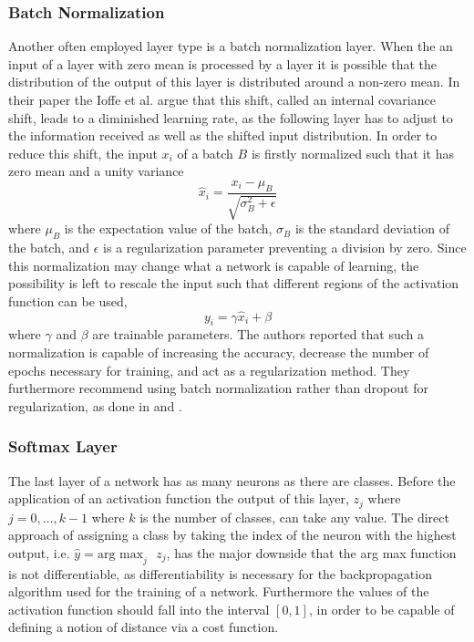 
\subsubsection{Batch Normalization}

Another often employed layer type is a batch normalization layer. When the an input of a layer with zero mean is processed by a layer it is possible that the distribution of the output of this layer is distributed around a non-zero mean. In their paper \cite{Ioffe2015} the Ioffe et al. argue that this shift, called an internal covariance shift, leads to a diminished learning rate, as the following layer has to adjust to the information received as well as the shifted input distribution. In order to reduce this shift, the input $x_i$ of a batch $B$ is firstly normalized such that it has zero mean and a unity variance
\begin{equation}
\hat{x}_i = \frac{x_i-\mu_B}{\sqrt{\sigma_B^2+\epsilon}}
\end{equation}
where $\mu_B$ is the expectation value of the batch, $\sigma_B$ is the standard deviation of the batch, and $\epsilon$ is a regularization parameter preventing a division by zero. Since this normalization may change what a network is capable of learning, the possibility is left to rescale the input such that different regions of the activation function can be used,
\begin{equation}
y_i = \gamma \hat{x}_i + \beta
\end{equation}
where $\gamma$ and $\beta$ are trainable parameters. The authors reported that such a normalization is capable of increasing the accuracy, decrease the number of epochs necessary for training, and act as a regularization method. They furthermore recommend using batch normalization rather than dropout for regularization, as done in \cite{Szegedy2015} and \cite{He2015a}. 

\subsubsection{Softmax Layer}
The last layer of a network has as many neurons as there are classes. Before the application of an activation function the output of this layer, $z_j$ where $j=0,\dots,k-1$ where $k$ is the number of classes, can take any value. The direct approach of assigning a class by taking the index of the neuron with the highest output, i.e. $\hat{y} = \text{arg max}_j \text{ } z_j$, has the major downside that the arg max function is not differentiable, as differentiability is necessary for the backpropagation algorithm used for the training of a network. Furthermore the values of the activation function should fall into the interval $[0,1]$, in order to be capable of defining a notion of distance via a cost function. \\

